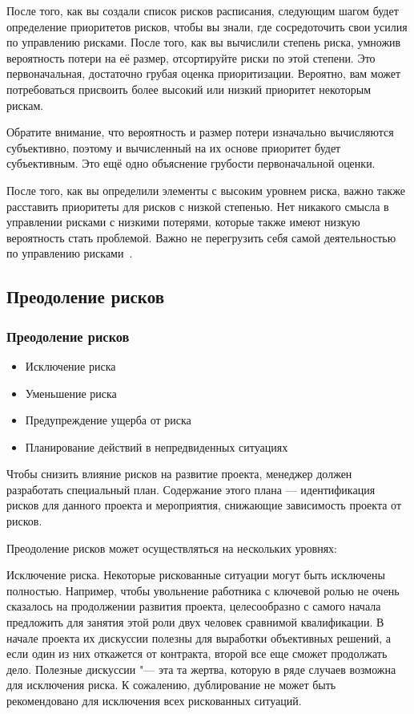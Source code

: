 \documentclass{../industrial-development}
\begin{document}
\lecturenotes

После того, как вы создали список рисков расписания, следующим шагом будет определение приоритетов рисков, чтобы вы знали, где сосредоточить свои усилия по управлению рисками. После того, как вы вычислили степень риска, умножив вероятность потери на её размер, отсортируйте риски по этой степени. Это первоначальная, достаточно грубая оценка приоритизации. Вероятно, вам может потребоваться присвоить более высокий или низкий приоритет некоторым рискам.

Обратите внимание, что вероятность и размер потери изначально вычисляются субъективно, поэтому и вычисленный на их основе приоритет будет субъективным. Это ещё одно объяснение грубости первоначальной оценки.

После того, как вы определили элементы с высоким уровнем риска, важно также расставить приоритеты для рисков с низкой степенью. Нет никакого смысла в управлении рисками с низкими потерями, которые также имеют низкую вероятность стать проблемой. Важно не перегрузить себя самой деятельностью по управлению рисками~\cite[с.~95--96]{McConnell}.

\subsection{Преодоление рисков}

\begin{frame} \frametitle{Преодоление рисков}
    \begin{itemize}
     \item Исключение риска
     \item Уменьшение риска
     \item Предупреждение ущерба от риска
     \item Планирование действий в непредвиденных ситуациях
    \end{itemize}
\end{frame}

\lecturenotes

Чтобы снизить влияние рисков на развитие проекта, менеджер должен разработать специальный план. Содержание этого плана — идентификация рисков для данного проекта и мероприятия, снижающие зависимость проекта от рисков.

Преодоление рисков может осуществляться на нескольких уровнях:

Исключение риска. Некоторые рискованные ситуации могут быть исключены полностью. Например, чтобы увольнение работника с ключевой ролью не очень сказалось на продолжении развития проекта, целесообразно с самого начала предложить для занятия этой роли двух человек сравнимой квалификации. В начале проекта их дискуссии полезны для выработки объективных решений, а если один из них откажется от контракта, второй все еще сможет продолжать дело. Полезные дискуссии "--- эта та жертва, которую в ряде случаев возможна для исключения риска. К сожалению, дублирование не может быть рекомендовано для исключения всех рискованных ситуаций.
\end{document}
